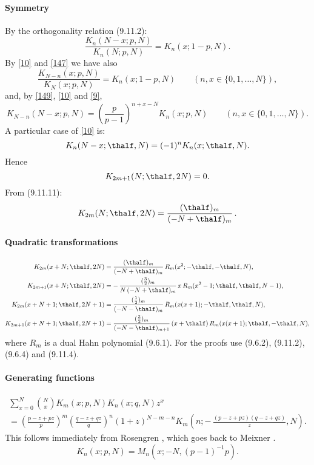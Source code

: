 \documentclass[envcountchap,graybox]{svmono}
\newcounter{rom}
\begin{document}
\paragraph{Symmetry}
By the orthogonality relation (9.11.2):
\begin{equation}
\frac{K_n(N-x;p,N)}{K_n(N;p,N)}=K_n(x;1-p,N).
\label{10}
\end{equation}
By \eqref{10} and \eqref{147} we have also
\begin{equation}
\frac{K_{N-n}(x;p,N)}{K_N(x;p,N)}=K_n(x;1-p,N)
\qquad(n,x\in\{0,1,\ldots,N\}),
\label{149}
\end{equation}
and, by \eqref{149}, \eqref{10} and \eqref{9},
\begin{equation}
K_{N-n}(N-x;p,N)=\left(\frac p{p-1}\right)^{n+x-N}K_n(x;p,N)
\qquad(n,x\in\{0,1,\ldots,N\}).
\label{150}
\end{equation}
A particular case of \eqref{10} is:
\begin{equation}
K_n(N-x;\thalf,N)=(-1)^n K_n(x;\thalf,N).
\label{11}
\end{equation}
Hence
\begin{equation}
K_{2m+1}(N;\thalf,2N)=0.
\label{12}
\end{equation}
From (9.11.11):
\begin{equation}
K_{2m}(N;\thalf,2N)=\frac{(\thalf)_m}{(-N+\thalf)_m}\,.
\label{13}
\end{equation}
%
\paragraph{Quadratic transformations}
\begin{align}
K_{2m}(x+N;\thalf,2N)&=\frac{(\thalf)_m}{(-N+\thalf)_m}\,
R_m(x^2;-\thalf,-\thalf,N),
\label{31}\\
K_{2m+1}(x+N;\thalf,2N)&=-\,\frac{(\tfrac32)_m}{N\,(-N+\thalf)_m}\,
x\,R_m(x^2-1;\thalf,\thalf,N-1),
\label{33}\\
K_{2m}(x+N+1;\thalf,2N+1)&=\frac{(\tfrac12)_m}{(-N-\thalf)_m}\,
R_m(x(x+1);-\thalf,\thalf,N),
\label{32}\\
K_{2m+1}(x+N+1;\thalf,2N+1)&=\frac{(\tfrac32)_m}{(-N-\thalf)_{m+1}}\,
(x+\thalf)\,R_m(x(x+1);\thalf,-\thalf,N),
\label{34}
\end{align}
where $R_m$ is a dual Hahn polynomial (9.6.1). For the proofs use
(9.6.2), (9.11.2), (9.6.4) and (9.11.4).
%
\paragraph{Generating functions}
\begin{multline}
\sum_{x=0}^N\binom Nx K_m(x;p,N)K_n(x;q,N)z^x\\
=\left(\frac{p-z+pz}p\right)^m
\left(\frac{q-z+qz}q\right)^n
(1+z)^{N-m-n}
K_m\left(n;-\,\frac{(p-z+pz)(q-z+qz)}z,N\right).
\label{107}
\end{multline}
This follows immediately from Rosengren \cite[(3.5)]{K8}, which goes back
to Meixner \cite{K9}.
$$K_n(x;p,N)=M_n(x;-N,(p-1)^{-1}p).$$
\end{document}

